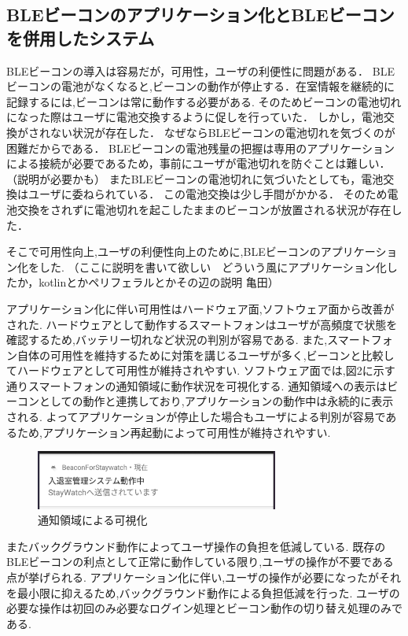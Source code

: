 
\subsection{BLEビーコンのアプリケーション化とBLEビーコンを併用したシステム}

BLEビーコンの導入は容易だが，可用性，ユーザの利便性に問題がある．
BLEビーコンの電池がなくなると,ビーコンの動作が停止する．在室情報を継続的に記録するには,ビーコンは常に動作する必要がある.
そのためビーコンの電池切れになった際はユーザに電池交換するように促しを行っていた．
しかし，電池交換がされない状況が存在した．
なぜならBLEビーコンの電池切れを気づくのが困難だからである．
BLEビーコンの電池残量の把握は専用のアプリケーションによる接続が必要であるため，事前にユーザが電池切れを防ぐことは難しい．　（説明が必要かも）
またBLEビーコンの電池切れに気づいたとしても，電池交換はユーザに委ねられている．
この電池交換は少し手間がかかる．
そのため電池交換をされずに電池切れを起こしたままのビーコンが放置される状況が存在した．

そこで可用性向上,ユーザの利便性向上のために,BLEビーコンのアプリケーション化をした.
（ここに説明を書いて欲しい　どういう風にアプリケーション化したか，kotlinとかペリフェラルとかその辺の説明  亀田）

アプリケーション化に伴い可用性はハードウェア面,ソフトウェア面から改善がされた.
ハードウェアとして動作するスマートフォンはユーザが高頻度で状態を確認するため,バッテリー切れなど状況の判別が容易である.
また,スマートフォン自体の可用性を維持するために対策を講じるユーザが多く,ビーコンと比較してハードウェアとして可用性が維持されやすい.
ソフトウェア面では,図2に示す通りスマートフォンの通知領域に動作状況を可視化する.
通知領域への表示はビーコンとしての動作と連携しており,アプリケーションの動作中は永続的に表示される.
よってアプリケーションが停止した場合もユーザによる判別が容易であるため,アプリケーション再起動によって可用性が維持されやすい.

\begin{figure}[tbh]
  \centering
  \includegraphics[width=8cm]{image/notify.jpg}
  \caption{通知領域による可視化}
  \label{multipleBPM}
\end{figure}

またバックグラウンド動作によってユーザ操作の負担を低減している.
既存のBLEビーコンの利点として正常に動作している限り,ユーザの操作が不要である点が挙げられる.
アプリケーション化に伴い,ユーザの操作が必要になったがそれを最小限に抑えるため,バックグラウンド動作による負担低減を行った.
ユーザの必要な操作は初回のみ必要なログイン処理とビーコン動作の切り替え処理のみである.

